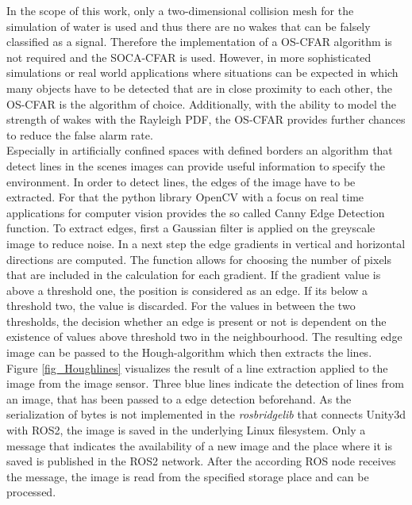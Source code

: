 In the scope of this work, only a two-dimensional collision mesh for the simulation of water is used and thus there are no wakes that can be falsely classified as a signal. Therefore the implementation of a \ac{OS-CFAR} algorithm is not required and the \ac{SOCA-CFAR} is used. However, in more sophisticated simulations or real world applications where situations can be expected in which many objects have to be detected that are in close proximity to each other, the \ac{OS-CFAR} is the algorithm of choice. Additionally, with the ability to model the strength of wakes with the Rayleigh \ac{PDF}, the \ac{OS-CFAR} provides further chances to reduce the false alarm rate.\\

Especially in artificially confined spaces with defined borders an algorithm that detect lines in the scenes images can provide useful information to specify the environment. In order to detect lines, the edges of the image have to be extracted. For that 
the python library OpenCV with a focus on real time applications for computer vision provides the so called Canny Edge Detection function. To extract edges, first a Gaussian filter is applied on the greyscale image to reduce noise. In a next step the edge gradients in vertical and horizontal directions are computed. The function allows for choosing the number of pixels that are included in the calculation for each gradient. If the gradient value is above a threshold one, the position is considered as an edge. If its below a threshold two, the value is discarded. For the values in between the two thresholds, the decision whether an edge is present or not is dependent on the existence of values above threshold two in the neighbourhood. The resulting edge image can be passed to the Hough-algorithm which then extracts the lines. Figure \ref{fig_Houghlines} visualizes the result of a line extraction applied to the image from the image sensor. Three blue lines indicate the detection of lines from an image, that has been passed to a edge detection beforehand. As the serialization of bytes is not implemented in the \textit{rosbridgelib} that connects Unity3d with ROS2, the image is saved in the underlying Linux filesystem. Only a message that indicates the availability of a new image and the place where it is saved is published in the ROS2 network. After the according \ac{ROS} node receives the message, the image is read from the specified storage place and can be processed.


